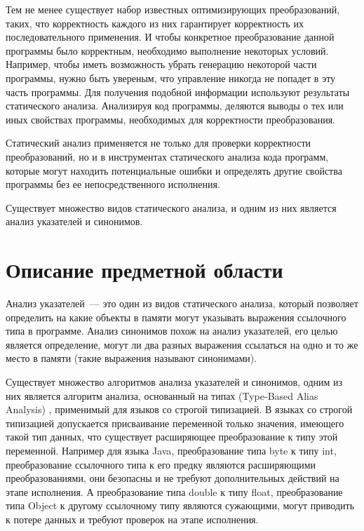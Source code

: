\documentclass[14pt,titlepage]{extarticle}
\newcommand{\eng}[1]{{\English#1}}
\begin{document}
    Тем не менее существует набор известных оптимизирующих преобразований,
    таких, что корректность каждого из них гарантирует корректность их
    последовательного применения.
    И чтобы конкретное преобразование данной программы было корректным,
    необходимо выполнение некоторых условий. Например, чтобы иметь
    возможность убрать генерацию некоторой части программы, нужно быть
    увереным, что управление никогда не попадет в эту часть программы.
    Для получения подобной информации используют результаты статического
    анализа. Анализируя код программы, деляются выводы о тех или иных свойствах
    программы, необходимых для корректности преобразования.

    Статический анализ применяется не только для проверки
    корректности преобразований, но и в инструментах статического анализа
    кода программ, которые могут находить потенциальные ошибки и определять
    другие свойства программы без ее непосредственного исполнения.

    Существует множество видов статического анализа, и одним из них
    является анализ указателей и синонимов.

  \newpage
  \section{Описание предметной области}

    Анализ указателей~--- это один из видов статического анализа, который
    позволяет определить на какие объекты в памяти могут указывать выражения
    ссылочного типа в программе. Анализ синонимов похож на анализ указателей,
    его целью является определение, могут ли два разных выражения ссылаться
    на одно и то же место в памяти (такие выражения называют синонимами).

    Существует множество алгоритмов анализа указателей и синонимов,
    одним из них является алгоритм анализа, основанный на типах
    (\eng{Type-Based Alias Analysis}) \cite{diwan_tbaa},
    применимый для языков со строгой типизацией.
    В языках со строгой типизацией допускается присваивание переменной только
    значения, имеющего такой тип данных, что существует расширяющее
    преобразование к типу этой переменной.
    Например для языка Java, преобразование типа byte к типу int,
    преобразование ссылочного типа к его предку являются расширяющими
    преобразованиями, они безопасны и не требуют дополнительных действий
    на этапе исполнения.
    А преобразование типа double к типу float, преобразование типа
    Object к другому ссылочному типу являются сужающими, могут приводить к
    потере данных и требуют проверок на этапе исполнения.
\end{document}
